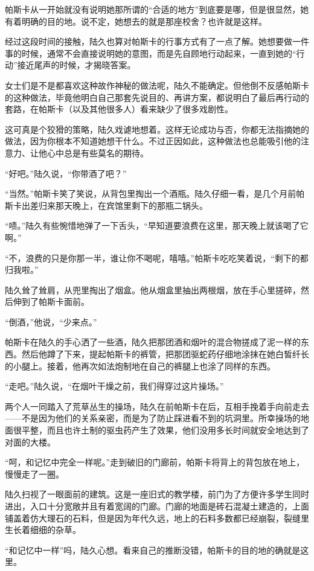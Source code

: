 帕斯卡从一开始就没有说明她那所谓的“合适的地方”到底要是哪，但是很显然，她有着明确的目的地。说不定，她想去的就是那座校舍？也许就是这样。

经过这段时间的接触，陆久也算对帕斯卡的行事方式有了一点了解。她想要做一件事的时候，通常不会直接说明她的意图，而是先自顾地行动起来，一直到她的“行动”接近尾声的时候，才揭晓答案。

女士们是不是都喜欢这种故作神秘的做法呢，陆久不能确定。但他倒不反感帕斯卡的这种做法，毕竟他明白自己那套先说目的、再讲方案，都说明白了最后再行动的套路，在帕斯卡（以及其他很多人）看来缺少了很多戏剧性。

这可真是个狡猾的策略，陆久戏谑地想着。这样无论成功与否，你都无法指摘她的做法，因为你根本不知道她想干什么。不过正因如此，这种做法也总能吸引他的注意力、让他心中总是有些莫名的期待。

“好吧。”陆久说，“你带酒了吧？”

“当然。”帕斯卡笑了笑说，从背包里掏出一个酒瓶。陆久仔细一看，是几个月前帕斯卡出差归来那天晚上，在宾馆里剩下的那瓶二锅头。

“啧。”陆久有些惋惜地弹了一下舌头，“早知道要浪费在这里，那天晚上就该喝了它啊。”

“不，浪费的只是你那一半，谁让你不喝呢，嘻嘻。”帕斯卡吃吃笑着说，“剩下的都归我啦。”

陆久耸了耸肩，从兜里掏出了烟盒。他从烟盒里抽出两根烟，放在手心里搓碎，然后伸到了帕斯卡面前。

“倒酒，”他说，“少来点。”

帕斯卡在陆久的手心洒了一些酒，陆久把那团酒和烟叶的混合物搓成了泥一样的东西。然后他蹲了下来，提起帕斯卡的裤管，把那团驱蛇药仔细地涂抹在她白皙纤长的小腿上。接着，他再次如法炮制地在自己的裤腿上也涂了同样的东西。

“走吧。”陆久说，“在烟叶干燥之前，我们得穿过这片操场。”

两个人一同踏入了荒草丛生的操场，陆久在前帕斯卡在后，互相手挽着手向前走去——不是因为他们的关系亲密，而是为了防止踩进看不到的坑洞里。所幸操场的地面很平整，而且也许土制的驱虫药产生了效果，他们没用多长时间就安全地达到了对面的大楼。

“呵，和记忆中完全一样呢。”走到破旧的门廊前，帕斯卡将背上的背包放在地上，慢慢走了一圈。

陆久扫视了一眼面前的建筑。这是一座旧式的教学楼，前门为了方便许多学生同时进出，入口十分宽敞并且有着宽阔的门廊。门廊的地面是砖石混凝土建造的，上面铺盖着仿大理石的石料，但是因为年代久远，地上的石料多数都已经崩裂，裂缝里生长着细细的杂草。

“和记忆中一样”吗，陆久心想。看来自己的推断没错，帕斯卡的目的地的确就是这里。

